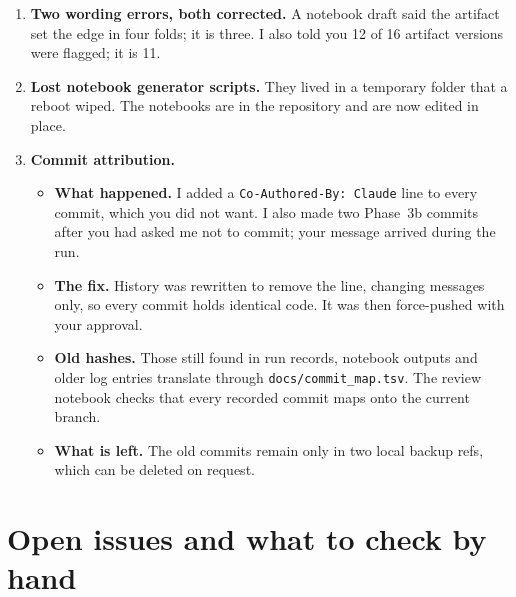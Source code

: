 \documentclass[11pt,a4paper]{article}
\newcommand{\code}[1]{\texttt{#1}}
\begin{document}
\begin{enumerate}
\begin{itemize}
  \end{itemize}
  Each check was rescoped to what matters, without loosening it: the code that produced the
  results must be unchanged, or shown equivalent by exact reproduction.
\item \textbf{Two wording errors, both corrected.} A notebook draft said the artifact set the
edge in four folds; it is three. I also told you 12 of 16 artifact versions were flagged; it
is 11.
\item \textbf{Lost notebook generator scripts.} They lived in a temporary folder that a reboot
wiped. The notebooks are in the repository and are now edited in place.
\item \textbf{Commit attribution.}
  \begin{itemize}
  \item \textbf{What happened.} I added a \code{Co-Authored-By: Claude} line to every commit,
  which you did not want. I also made two Phase~3b commits after you had asked me not to commit;
  your message arrived during the run.
  \item \textbf{The fix.} History was rewritten to remove the line, changing messages only, so
  every commit holds identical code. It was then force-pushed with your approval.
  \item \textbf{Old hashes.} Those still found in run records, notebook outputs and older log
  entries translate through \code{docs/commit\_map.tsv}. The review notebook checks that every
  recorded commit maps onto the current branch.
  \item \textbf{What is left.} The old commits remain only in two local backup refs, which can
  be deleted on request.
  \end{itemize}
\end{enumerate}

\section{Open issues and what to check by hand}
\end{document}
